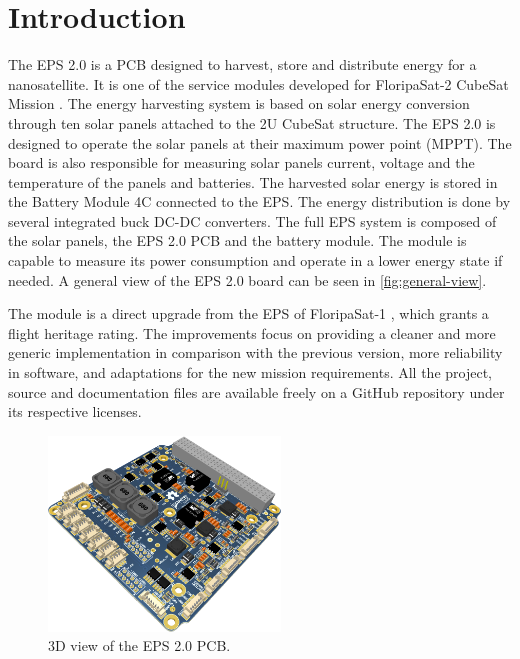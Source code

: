%
%
%
%
%

%
%
%
%
%
%

\chapter{Introduction} \label{ch:introduction}

The EPS 2.0 is a PCB designed to harvest, store and distribute energy for a nanosatellite. It is one of the service modules developed for FloripaSat-2 CubeSat Mission \cite{floripasat2-doc}. The energy harvesting system is based on solar energy conversion through ten solar panels attached to the 2U CubeSat structure. The EPS 2.0 is designed to operate the solar panels at their maximum power point (MPPT). The board is also responsible for measuring solar panels current, voltage and the temperature of the panels and batteries. The harvested solar energy is stored in the Battery Module 4C \cite{bat4c} connected to the EPS. The energy distribution is done by several integrated buck DC-DC converters. The full EPS system is composed of the solar panels, the EPS 2.0 PCB and the battery module. The module is capable to measure its power consumption and operate in a lower energy state if needed. A general view of the EPS 2.0 board can be seen in \autoref{fig:general-view}.

The module is a direct upgrade from the EPS of FloripaSat-1 \cite{eps-fsat}, which grants a flight heritage rating. The improvements focus on providing a cleaner and more generic implementation in comparison with the previous version, more reliability in software, and adaptations for the new mission requirements. All the project, source and documentation files are available freely on a GitHub repository \cite{eps2} under its respective licenses.

\begin{figure}[!ht]
    \begin{center}
        \includegraphics[width=0.55\textwidth]{figures/eps2-pcb-3d}
        \caption{3D view of the EPS 2.0 PCB.}
        \label{fig:general-view}
    \end{center}
\end{figure}